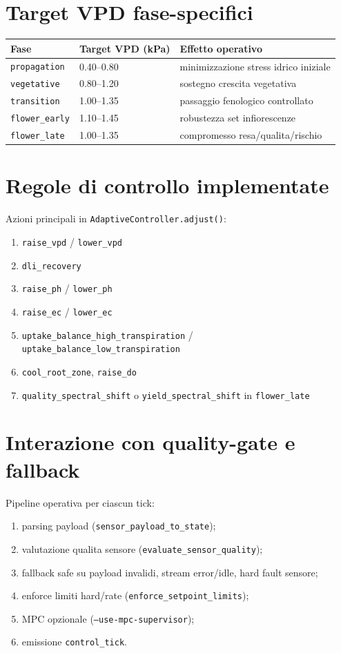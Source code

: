 ﻿\documentclass[11pt,a4paper]{report}
\begin{document}
\section{Target VPD fase-specifici}
\begin{longtable}{@{}p{3.4cm}p{3.0cm}p{7.4cm}@{}}
\toprule
Fase & Target VPD (kPa) & Effetto operativo \\ \midrule
\texttt{propagation} & 0.40--0.80 & minimizzazione stress idrico iniziale \\
\texttt{vegetative} & 0.80--1.20 & sostegno crescita vegetativa \\
\texttt{transition} & 1.00--1.35 & passaggio fenologico controllato \\
\texttt{flower\_early} & 1.10--1.45 & robustezza set infiorescenze \\
\texttt{flower\_late} & 1.00--1.35 & compromesso resa/qualita/rischio \\
\bottomrule
\end{longtable}

\section{Regole di controllo implementate}
Azioni principali in \texttt{AdaptiveController.adjust()}:
\begin{enumerate}
  \item \texttt{raise\_vpd} / \texttt{lower\_vpd}
  \item \texttt{dli\_recovery}
  \item \texttt{raise\_ph} / \texttt{lower\_ph}
  \item \texttt{raise\_ec} / \texttt{lower\_ec}
  \item \texttt{uptake\_balance\_high\_transpiration} / \texttt{uptake\_balance\_low\_transpiration}
  \item \texttt{cool\_root\_zone}, \texttt{raise\_do}
  \item \texttt{quality\_spectral\_shift} o \texttt{yield\_spectral\_shift} in \texttt{flower\_late}
\end{enumerate}

\section{Interazione con quality-gate e fallback}
Pipeline operativa per ciascun tick:
\begin{enumerate}
  \item parsing payload (\texttt{sensor\_payload\_to\_state});
  \item valutazione qualita sensore (\texttt{evaluate\_sensor\_quality});
  \item fallback safe su payload invalidi, stream error/idle, hard fault sensore;
  \item enforce limiti hard/rate (\texttt{enforce\_setpoint\_limits});
  \item MPC opzionale (\texttt{--use-mpc-supervisor});
  \item emissione \texttt{control\_tick}.
\end{enumerate}
\end{document}
